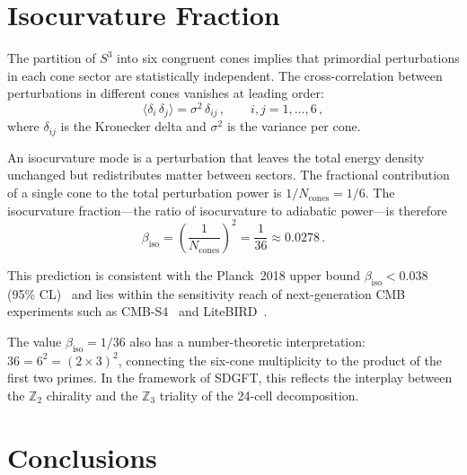 \documentclass[amsmath,amssymb,aps,prd,twocolumn,superscriptaddress,nofootinbib]{revtex4-2}
\begin{document}
\section{Isocurvature Fraction}\label{sec:isocurvature}

The partition of $S^3$ into six congruent cones implies that primordial
perturbations in each cone sector are statistically independent.  The
cross-correlation between perturbations in different cones vanishes at leading
order:
\begin{equation}\label{eq:cross}
  \langle \delta_i\, \delta_j \rangle = \sigma^2\,\delta_{ij}\,,
  \qquad i,j = 1,\ldots,6\,,
\end{equation}
where $\delta_{ij}$ is the Kronecker delta and $\sigma^2$ is the variance per
cone.

An isocurvature mode is a perturbation that leaves the total energy density
unchanged but redistributes matter between sectors.  The fractional
contribution of a single cone to the total perturbation power is
$1/N_{\text{cones}} = 1/6$.  The isocurvature fraction---the ratio of
isocurvature to adiabatic power---is therefore
\begin{equation}\label{eq:beta}
  \boxed{\;\beta_{\mathrm{iso}}
  = \left(\frac{1}{N_{\text{cones}}}\right)^{\!2}
  = \frac{1}{36} \approx 0.0278\,.\;}
\end{equation}

This prediction is consistent with the Planck~2018 upper bound
$\beta_{\mathrm{iso}} < 0.038$ (95\% CL)~\cite{Planck2018} and lies within
the sensitivity reach of next-generation CMB experiments such as
CMB-S4~\cite{CMBS4} and LiteBIRD~\cite{LiteBIRD2023}.

The value $\beta_{\mathrm{iso}} = 1/36$ also has a number-theoretic
interpretation: $36 = 6^2 = (2\times 3)^2$, connecting the six-cone
multiplicity to the product of the first two primes.  In the framework of
SDGFT, this reflects the interplay between the $\mathbb{Z}_2$ chirality and
the $\mathbb{Z}_3$ triality of the 24-cell decomposition.

\section{Conclusions}\label{sec:conclusions}
\end{document}
